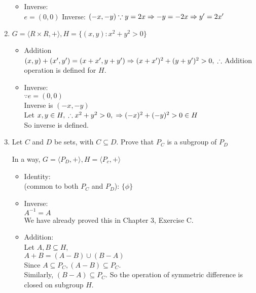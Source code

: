 \documentclass[12pt]{article}
\begin{document}
\begin{enumerate}
\begin{itemize}
    \item 
      Inverse: \\
      $e = (0,0)$ 
      Inverse: $(-x, -y) \\
      \because y = 2x \\
      \Rightarrow -y = -2x \\
      \Rightarrow y' = 2x'$

  \end{itemize}

\item $G = \langle R \times  R, + \rangle, H = \{(x,y) : x^{2} + y^{2} > 0\}$

  \begin{itemize}
    \item 
      Addition \\
      $(x,y) + (x',y') = (x + x', y+y') \\
      \Rightarrow (x+x')^{2} + (y+y')^{2} > 0, \\
      \therefore$ Addition operation is defined for $H$.
      
    \item
      Inverse: \\
      $\because e = (0,0)$ \\
      Inverse is $(-x, -y)$ \\
      Let $x, y \in H, \\
      \therefore x^{2} + y^{2} > 0, \\
      \Rightarrow (-x)^{2} + (-y)^{2} > 0 \in H$ \\
      So inverse is defined.

  \end{itemize}

\item Let $C$ and $D$ be sets, with $C \subseteq D$. Prove that $P_C$ is a subgroup of $P_D$

  In a way, $G = \langle P_D , + \rangle, H = \langle P_c , + \rangle$
  
\begin{itemize}
  \item 
    Identity: \\ (common to both $P_C$ and $P_D$): $\{\phi\}$
  \item 
    Inverse: \\
    $A^{-1} = A$ \\
    We have already proved this in Chapter 3, Exercise C.
  \item 
    Addition: \\
    Let $A, B \subseteq H$, \\
    $A + B = (A - B) \cup (B - A)$ \\
    Since $A \subseteq P_C, (A - B) \subseteq P_C$. \\ 
    Similarly, $(B - A) \subseteq P_C$. So the operation of symmetric difference is closed on subgroup $H$. 

\end{itemize}

  \end{enumerate}
\end{document}
